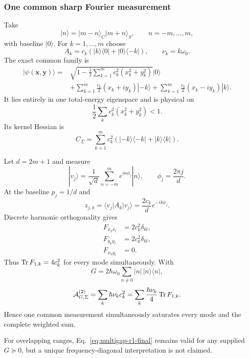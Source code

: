 \subsubsection{One common sharp Fourier measurement}

Take
\begin{equation}
|n\rangle=|m-n\rangle_C|m+n\rangle_S,
\qquad n=-m,\ldots,m,
\end{equation}
with baseline $|0\rangle$. For $k=1,\ldots,m$ choose
\begin{equation}
A_k=c_k(|k\rangle\langle0|+|0\rangle\langle-k|),
\qquad
\nu_k=k\omega_0.
\end{equation}
The exact common family is
\begin{align}
|\psi(\bm x,\bm y)\rangle={}&
\sqrt{1-\frac12\sum_{k=1}^m c_k^2(x_k^2+y_k^2)}|0\rangle\\
&+\sum_{k=1}^m\frac{c_k}{2}(x_k+i y_k)|-k\rangle
+\sum_{k=1}^m\frac{c_k}{2}(x_k-i y_k)|k\rangle.
\end{align}
It lies entirely in one total-energy eigenspace and is physical on
\begin{equation}
\frac12\sum_kc_k^2(x_k^2+y_k^2)<1.
\end{equation}
Its kernel Hessian is
\begin{equation}
C_\Sigma
=\sum_{k=1}^m c_k^2
(|-k\rangle\langle-k|+|k\rangle\langle k|).
\end{equation}

Let $d=2m+1$ and measure
\begin{equation}
|v_j\rangle
=\frac1{\sqrt d}\sum_{n=-m}^{m}e^{in\phi_j}|n\rangle,
\qquad
\phi_j=\frac{2\pi j}{d}.
\end{equation}
At the baseline $p_j=1/d$ and
\begin{equation}
z_{j,k}=\langle v_j|A_k|v_j\rangle
=\frac{2c_k}{d}e^{-ik\phi_j}.
\end{equation}
Discrete harmonic orthogonality gives
\begin{align}
F_{x_kx_l}&=2c_k^2\delta_{kl},\\
F_{y_ky_l}&=2c_k^2\delta_{kl},\\
F_{x_ky_l}&=0.
\end{align}
Thus $\operatorname{Tr} F_{1,k}=4c_k^2$ for every mode simultaneously. With
\begin{equation}
G=2\hbar\omega_0\sum_{n\ne0}|n|\,|n\rangle\langle n|,
\end{equation}
\begin{equation}
\mathcal A_{G,\Sigma}^{(2)}
=\sum_k\hbar\nu_k c_k^2
=\sum_k\frac{\hbar\nu_k}{4}\operatorname{Tr} F_{1,k}.
\end{equation}
Hence one common measurement simultaneously saturates every mode and the complete weighted sum.

For overlapping ranges, Eq.~\eqref{eq:multigap-r1-final} remains valid for any supplied $G\succeq0$, but a unique frequency-diagonal interpretation is not claimed.
